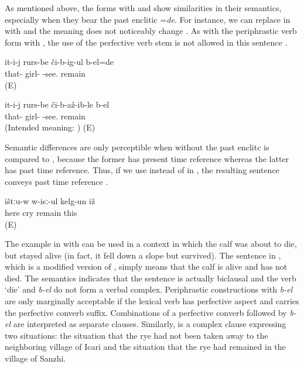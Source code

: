 As mentioned above, the forms with  and  show similarities in their semantics, especially when they bear the past enclitic =\textit{de}. For instance, we can replace  in  with  and the meaning does not noticeably change . As with the periphrastic verb form with , the use of the perfective verb stem is not allowed in this sentence .
%
\begin{exe}
	\ex	\label{‎‎He was seeing the girls.BEL}
	\gll it-i-j	rurs-be	či-b-ig-ul	b-el=de\\
	that-	girl-	-see.	remain\\
	\glt {} (E)
	
	\ex	\label{‎‎He was seeing the girls.UNGRAM2}
	\gll * it-i-j	rurs-be	či-b-až-ib-le	b-el\\
	{} that-	girl-	-see.	remain\\
	\glt {} (Intended meaning: ) (E)

\end{exe}

Semantic differences are only perceptible when  without the past enclitc is compared to , because the former has present time reference whereas the latter has past time reference. Thus, if we use  instead of  in , the resulting sentence conveys past time reference .
%
\begin{exe}
	\ex	\label{ex:Here he remained crying kelg-un}
	\gll	ištːu-w	w-isː-ul	kelg-un	iž\\
		here	cry	remain	this\\
	\glt	{} (E)

\end{exe}


The example in  with  can be used in a context in which the calf was about to die, but stayed alive (in fact, it fell down a slope but survived). The sentence in , which is a modified version of , simply means that the calf is alive and has not died. The semantics indicates that the sentence is actually biclausal and the verb `die' and \textit{b-el} do not form a verbal complex. Periphrastic constructions with \textit{b-el} are only marginally acceptable if the lexical verb has perfective aspect and carries the perfective converb suffix. Combinations of a perfective converb followed by \textit{b-el} are interpreted as separate clauses. Similarly,  is a complex clause expressing two situations: the situation that the rye had not been taken away to the neighboring village of Icari and the situation that the rye had remained in the village of Sanzhi. 

